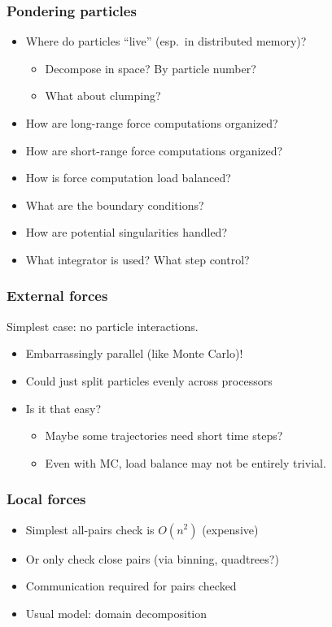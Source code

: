 \documentclass{beamer}
\begin{document}
\begin{frame}
  \frametitle{Pondering particles}
  
  \begin{itemize}
  \item Where do particles ``live'' (esp.~in distributed memory)?
    \begin{itemize}
    \item Decompose in space?  By particle number?
    \item What about clumping?
    \end{itemize}
  \item How are long-range force computations organized?
  \item How are short-range force computations organized?
  \item How is force computation load balanced?
  \item What are the boundary conditions?
  \item How are potential singularities handled?
  \item What integrator is used?  What step control?
  \end{itemize}
\end{frame}


\begin{frame}
  \frametitle{External forces}

  Simplest case: no particle interactions.
  \begin{itemize}
    \item Embarrassingly parallel (like Monte Carlo)!
    \item Could just split particles evenly across processors
    \item Is it that easy?
      \begin{itemize}
      \item Maybe some trajectories need short time steps?
      \item Even with MC, load balance may not be entirely trivial.
      \end{itemize}
  \end{itemize}
\end{frame}


\begin{frame}
  \frametitle{Local forces}
  
  \begin{center}
    
  \end{center}
  \begin{itemize}
  \item Simplest all-pairs check is $O(n^2)$ (expensive)
  \item Or only check close pairs (via binning, quadtrees?)
  \item Communication required for pairs checked
  \item Usual model: domain decomposition
  \end{itemize}

\end{frame}
\end{document}
